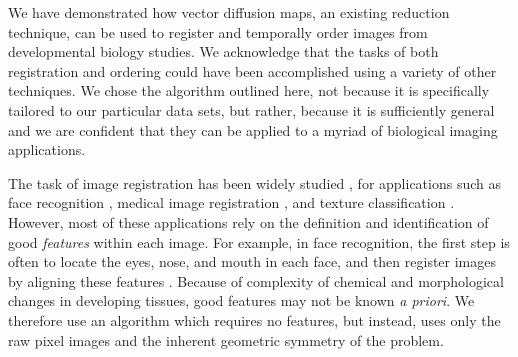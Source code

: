 \documentclass{pnastwo}
\begin{document}
\begin{article}
We have demonstrated how vector diffusion maps, an existing reduction technique, can be used to register and temporally order images from developmental biology studies. 
%
We acknowledge that the tasks of both registration and ordering could have been accomplished using a variety of other techniques.
%
We chose the algorithm outlined here, not because it is specifically tailored to our particular data sets, but rather, because it is sufficiently general and we are confident that they can be applied to a myriad of biological imaging applications. 

The task of image registration has been widely studied \cite{zitova2003image}, for applications such as face recognition \cite{rowley1998rotation}, medical image registration \cite{hajnal2010medical}, and texture classification \cite{greenspan1994rotation}.
%
However, most of these applications rely on the definition and identification of good {\it features} within each image. 
%
For example, in face recognition, the first step is often to locate the eyes, nose, and mouth in each face, and then register images by aligning these features \cite{zhao2003face}.
%
%
Because of complexity of chemical and morphological changes in developing tissues, good features may not be known {\it a priori}.
%
We therefore use an algorithm which requires no features, but instead, uses only the raw pixel images and the inherent geometric symmetry of the problem.
%
%
%


\end{article}
\end{document}
